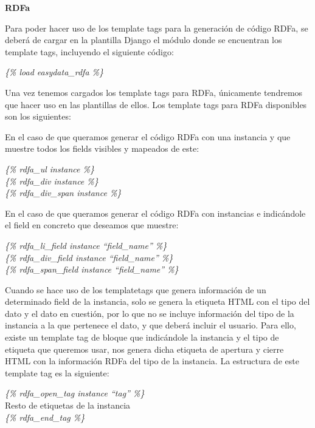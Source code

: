 \begin{center}
    \textbf{RDFa}
\end{center}

Para poder hacer uso de los template tags para la generación de código RDFa, se
deberá de cargar en la plantilla Django el módulo donde se encuentran los
template tags, incluyendo el siguiente código:

\begin{center}
    \textit{\{\% load easydata\_rdfa \%\}}
\end{center}

Una vez tenemos cargados los template tags para RDFa, únicamente tendremos que
hacer uso en las plantillas de ellos. Los template tags para RDFa disponibles
son los siguientes:

En el caso de que queramos generar el código RDFa con una instancia y que
muestre todos los fields visibles y mapeados de este:
\begin{center}
    \textit{\{\% rdfa\_ul instance \%\}}\\
    \textit{\{\% rdfa\_div instance \%\}}\\
    \textit{\{\% rdfa\_div\_span instance \%\}}\\
\end{center}

En el caso de que queramos generar el código RDFa con instancias e
indicándole el field en concreto que deseamos que muestre:
\begin{center}
    \textit{\{\% rdfa\_li\_field instance ``field\_name'' \%\}}\\
    \textit{\{\% rdfa\_div\_field instance ``field\_name'' \%\}}\\
    \textit{\{\% rdfa\_span\_field instance ``field\_name'' \%\}}\\
\end{center}

Cuando se hace uso de los templatetags que genera información de un determinado
field de la instancia, solo se genera la etiqueta HTML con el tipo del dato y el
dato en cuestión, por lo que no se incluye información del tipo de la instancia
a la que pertenece el dato, y que deberá incluir el usuario. Para ello, existe
un template tag de bloque que indicándole la instancia y el tipo de etiqueta que
queremos usar, nos genera dicha etiqueta de apertura y cierre HTML con la
información RDFa del tipo de la instancia. La estructura de este template tag es
la siguiente:
\begin{center}
    \textit{\{\% rdfa\_open\_tag instance ``tag'' \%\}}\\
    Resto de etiquetas de la instancia\\
    \textit{\{\% rdfa\_end\_tag \%\}}\\
\end{center}

